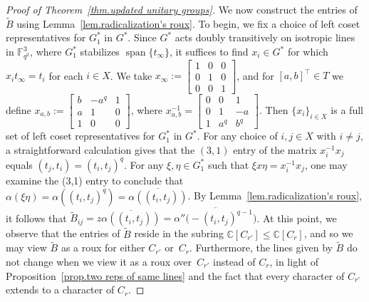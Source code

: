 \documentclass[11pt]{article}
\theoremstyle{definition}
\numberwithin{equation}{section}
\begin{document}
\begin{proof}[Proof of Theorem~\ref{thm.updated unitary groups}]
We now construct the entries of $\tilde{B}$ using Lemma~\ref{lem.radicalization's roux}.
To begin, we fix a choice of left coset representatives for $G_1^*$ in $G^*$.
Since $G^*$ acts doubly transitively on isotropic lines in $\mathbb{F}_{q^2}^3$, where $G_1^*$ stabilizes $\operatorname{span}\{t_\infty\}$, it suffices to find $x_i\in G^*$ for which $x_it_\infty=t_i$ for each $i\in X$.
We take $x_\infty:=\left[\begin{array}{ccc}1&0&0\\0&1&0\\0&0&1\end{array}\right]$, and for $[a,b]^\top\in T$ we define 
$x_{a,b}:=\left[\begin{array}{ccc}b&-a^q&1\\a&1&0\\1&0&0\end{array}\right]$, 
where 
$x_{a,b}^{-1}=\left[\begin{array}{ccc}0&0&1\\0&1&-a\\1&a^q&b^q\end{array}\right]$.
Then $\{x_i\}_{i\in X}$ is a full set of left coset representatives for $G_1^*$ in $G^*$.
For any choice of $i,j\in X$ with $i\neq j$, a straightforward calculation gives that the $(3,1)$ entry of the matrix $x_i^{-1}x_j$ equals $(t_j,t_i)=(t_i,t_j)^q$.
For any $\xi,\eta\in G_1^*$ such that $\xi x \eta = x_i^{-1}x_j$, one may examine the (3,1) entry to conclude that $\alpha(\xi \eta) = \alpha( (t_i,t_j)^q) = \overline{ \alpha( (t_i,t_j) ) }$.
By Lemma~\ref{lem.radicalization's roux}, it follows that $\tilde{B}_{ij} = z \overline{ \alpha( (t_i,t_j) ) } = \overline{ \alpha''\bigl(- (t_i,t_j)^{q-1} \bigr)}$.
At this point, we observe that the entries of $\tilde{B}$ reside in the subring $\mathbb{C}[C_{r'}] \leq \mathbb{C}[C_{r}]$, and so we may view $\tilde{B}$ as a roux for either $C_{r'}$ or~$C_{r}$.
Furthermore, the lines given by $\tilde{B}$ do not change when we view it as a roux over~$C_{r'}$ instead of $C_r$, in light of Proposition~\ref{prop.two reps of same lines} and the fact that every character of $C_{r'}$ extends to a character of $C_r$.


\end{proof}
\end{document}

